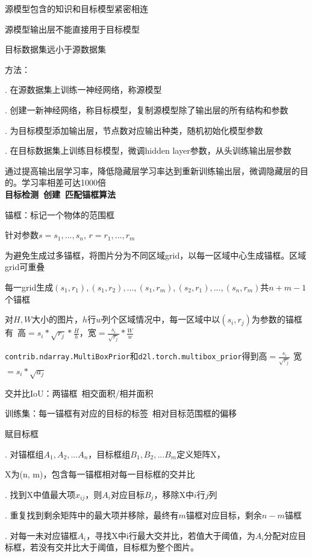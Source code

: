 \documentclass[UTF8]{ctexart}
\begin{document}
  \quad 源模型包含的知识和目标模型紧密相连
  
  \quad 源模型输出层不能直接用于目标模型

  \quad 目标数据集远小于源数据集

  方法：
 
  . 在源数据集上训练一神经网络，称源模型

  . 创建一新神经网络，称目标模型，复制源模型除了输出层的所有结构和参数

  . 为目标模型添加输出层，节点数对应输出种类，随机初始化模型参数

  . 在目标数据集上训练目标模型，微调hidden layer参数，从头训练输出层参数

  \quad \quad 通过提高输出层学习率，降低隐藏层学习率达到重新训练输出层，微调隐藏层的目的。学习率相差可达1000倍\\
\textbf{目标检测\ 创建\ 匹配锚框算法}

  锚框：标记一个物体的范围框

  \quad 针对参数$s = {s_1, ..., s_n}$, $r = {r_1, ..., r_m}$

  \quad 为避免生成过多锚框，将图片分为不同区域grid，以每一区域中心生成锚框。区域grid可重叠

  \quad 每一grid生成$(s_1, r_1), (s_1, r_2), ..., (s_1, r_m), (s_2, r_1), ..., (s_n, r_m)$共$n+m-1$个锚框

  \quad 对$H, W$大小的图片，$h$行$w$列个区域情况中，每一区域中以$(s_i, r_j)$为参数的锚框有\ 高$ = s_i*\sqrt{r_j} * \frac{H}{h}$，宽$ = \frac{s_i}{\sqrt{r_j}} * \frac{W}{w}$

  \quad \quad \texttt{contrib.ndarray.MultiBoxPrior}和\texttt{d2l.torch.multibox\_prior}得到高$=\frac{s_i}{\sqrt{r_j}}$ 宽$ = s_i*\sqrt{a_j}$

  交并比IoU：两锚框\ 相交面积/相并面积

  训练集：每一锚框有对应的目标的标签\ 相对目标范围框的偏移

  \quad 赋目标框

  \quad {}. 对锚框组$A_1, A_2, ...A_n$，目标框组$B_1, B_2, ...B_m$定义矩阵X，

  \quad \quad \quad X为(n, m)，包含每一锚框相对每一目标框的交并比

  \quad {}. 找到X中值最大项$x_{ij}$，则$A_i$对应目标$B_j$，移除X中$i$行$j$列

  \quad {}. 重复找到剩余矩阵中的最大项并移除，最终有$m$锚框对应目标，剩余$n-m$锚框

  \quad {}. 对每一未对应锚框$A_i$，寻找X中i行最大交并比，若值大于阈值，为$A_i$分配对应目标框，若没有交并比大于阈值，目标框为整个图片。
\end{document}
